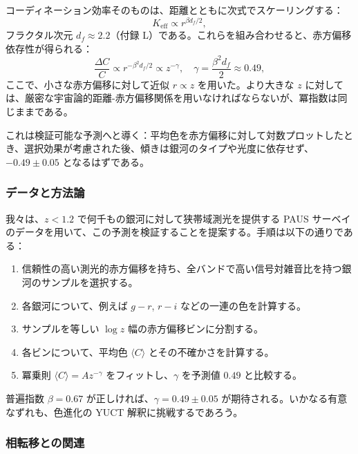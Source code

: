 \documentclass[11pt,a4paper]{article}
\begin{document}
	コーディネーション効率そのものは、距離とともに次式でスケーリングする：
	\begin{equation}
		K_{\mathrm{eff}} \propto r^{\beta d_f / 2},
	\end{equation}
	フラクタル次元 \(d_f \approx 2.2\)（付録 L）である。これらを組み合わせると、赤方偏移依存性が得られる：
	\begin{equation}
		\frac{\Delta C}{C} \propto r^{-\beta^2 d_f / 2} \propto z^{-\gamma}, \quad \gamma = \frac{\beta^2 d_f}{2} \approx 0.49,
	\end{equation}
	ここで、小さな赤方偏移に対して近似 \(r \propto z\) を用いた。より大きな \(z\) に対しては、厳密な宇宙論的距離-赤方偏移関係を用いなければならないが、冪指数は同じままである。
	
	これは検証可能な予測へと導く：平均色を赤方偏移に対して対数プロットしたとき、選択効果が考慮された後、傾きは銀河のタイプや光度に依存せず、\(-0.49 \pm 0.05\) となるはずである。
	
	\subsubsection{データと方法論}
	
	我々は、\(z < 1.2\) で何千もの銀河に対して狭帯域測光を提供する PAUS サーベイ \cite{Alarcon2019} のデータを用いて、この予測を検証することを提案する。手順は以下の通りである：
	\begin{enumerate}
		\item 信頼性の高い測光的赤方偏移を持ち、全バンドで高い信号対雑音比を持つ銀河のサンプルを選択する。
		\item 各銀河について、例えば \(g-r\), \(r-i\) などの一連の色を計算する。
		\item サンプルを等しい \(\log z\) 幅の赤方偏移ビンに分割する。
		\item 各ビンについて、平均色 \(\langle C \rangle\) とその不確かさを計算する。
		\item 冪乗則 \(\langle C \rangle = A z^{-\gamma}\) をフィットし、\(\gamma\) を予測値 \(0.49\) と比較する。
	\end{enumerate}
	
	普遍指数 \(\beta = 0.67\) が正しければ、\(\gamma = 0.49 \pm 0.05\) が期待される。いかなる有意なずれも、色進化の YUCT 解釈に挑戦するであろう。
	
	\subsubsection{相転移との関連}
	
\end{document}
